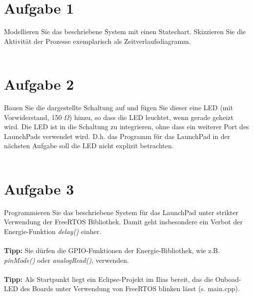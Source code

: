 \section{Aufgabe 1}
Modellieren Sie das beschriebene System mit einen Statechart. Skizzieren Sie die Aktivität der Prozesse exemplarisch als Zeitverlaufsdiagramm.\\ \\


\section{Aufgabe 2}
Bauen Sie die dargestellte Schaltung auf und fügen Sie dieser eine LED (mit Vorwiderstand, 150 $\Omega$) hinzu, so dass die LED leuchtet, wenn gerade geheizt wird. Die LED ist in die Schaltung zu integrieren, ohne dass ein weiterer Port des LaunchPads verwendet wird. D.h. das Programm für das LaunchPad in der nächsten Aufgabe soll die LED nicht explizit betrachten.\\ \\

	
\section{Aufgabe 3}
Programmieren Sie das beschriebene System für das LaunchPad unter strikter Verwendung der FreeRTOS Bibliothek. Damit geht insbesondere ein Verbot der Energie-Funktion \textit{delay()} einher.\\ \\
\textbf{Tipp:} Sie dürfen die GPIO-Funktionen der Energie-Bibliothek, wie z.B. \textit{pinMode()} oder \textit{analogRead()}, verwenden.\\ \\
\textbf{Tipp:} Als Startpunkt liegt ein Eclipse-Projekt im Ilias bereit, das die Onboad-LED des Boards unter Verwendung von FreeRTOS blinken lässt (s. main.cpp).\\ \\